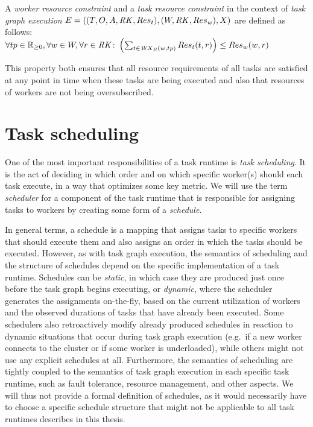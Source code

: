 \vspace{2mm} A
\emph{worker resource constraint} and a \emph{task resource constraint} in the context of
\emph{task graph execution}
$E = ((T, O, A, \mathit{RK}, Res_t), (W, \mathit{RK}, Res_w), X)$
are defined as follows: \vspace{1mm}\\
$\forall tp\in\mathbb{R}_{\geq{}0}, \forall w\in{}W, \forall
r\in{}\mathit{RK}\colon \left(\sum_{t\in{}\mathit{WX}_E(w, tp)} Res_t(t, r)\right) \leq
Res_w(w, r)$

\vspace{1mm}This property both ensures that all resource requirements of all tasks are
satisfied at any point in time when these tasks are being executed and also that resources of
workers are not being oversubscribed.

\section{Task scheduling}
\label{sec:task-scheduling}
One of the most important responsibilities of a task runtime is \emph{task scheduling}. It is the
act of deciding in which order and on which specific worker(s) should each task execute, in a way
that optimizes some key metric. We will use the term \emph{scheduler} for a component of the
task runtime that is responsible for assigning tasks to workers by creating some form of a
\emph{schedule}.

In general terms, a schedule is a mapping that assigns tasks to specific workers that should
execute them and also assigns an order in which the tasks should be executed. However, as with task
graph execution, the semantics of scheduling and the structure of schedules depend on the specific
implementation of a task runtime. Schedules can be \emph{static}, in which case they are
produced just once before the task graph begins executing, or \emph{dynamic}, where the
scheduler generates the assignments on-the-fly, based on the current utilization of workers and the
observed durations of tasks that have already been executed. Some schedulers also retroactively
modify already produced schedules in reaction to dynamic situations that occur during task graph
execution (e.g.\ if a new worker connects to the cluster or if some worker is underloaded), while
others might not use any explicit schedules at all. Furthermore, the semantics of scheduling are
tightly coupled to the semantics of task graph execution in each specific task runtime, such as
fault tolerance, resource management, and other aspects. We will thus not provide a formal
definition of schedules, as it would necessarily have to choose a specific schedule structure that
might not be applicable to all task runtimes describes in this thesis.

